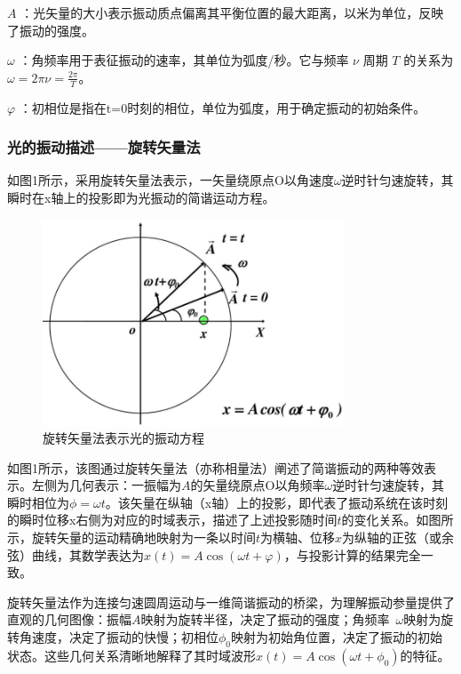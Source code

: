 \documentclass[withoutpreface,bwprint]{cumcmthesis} %
\begin{document}
\(A\) ：光矢量的大小表示振动质点偏离其平衡位置的最大距离，以米为单位，反映了振动的强度。

\(\omega\) ：角频率用于表征振动的速率，其单位为弧度/秒。它与频率 \(\nu\) 周期 \(T\) 的关系为 \(\omega = 2\pi\nu = \frac{2\pi}{T}\)。

\(\varphi\) ：初相位是指在t=0时刻的相位，单位为弧度，用于确定振动的初始条件。

\subsubsection{光的振动描述——旋转矢量法}
如图1所示，采用旋转矢量法表示，一矢量绕原点O以角速度$\omega$逆时针匀速旋转，其瞬时在x轴上的投影即为光振动的简谐运动方程。

\begin{figure}[!h]
    \centering
    \includegraphics[width=0.8\textwidth]{figures/figure1.png} %

    \caption{旋转矢量法表示光的振动方程}
    \label{fig:1}
\end{figure}

如图1所示，该图通过旋转矢量法（亦称相量法）阐述了简谐振动的两种等效表示。左侧为几何表示：一振幅为$A$的矢量绕原点O以角频率$\omega$逆时针匀速旋转，其瞬时相位为$\phi=\omega t$。该矢量在纵轴（x轴）上的投影，即代表了振动系统在该时刻的瞬时位移x右侧为对应的时域表示，描述了上述投影随时间$t$的变化关系。如图所示，旋转矢量的运动精确地映射为一条以时间$t$为横轴、位移$x$为纵轴的正弦（或余弦）曲线，其数学表达为$x(t)=A\cos(\omega t+\varphi)$，与投影计算的结果完全一致。

旋转矢量法作为连接匀速圆周运动与一维简谐振动的桥梁，为理解振动参量提供了直观的几何图像：振幅$A$映射为旋转半径，决定了振动的强度；角频率 $\omega$映射为旋转角速度，决定了振动的快慢；初相位$\phi_0$映射为初始角位置，决定了振动的初始状态。这些几何关系清晰地解释了其时域波形$x(t)=A\cos(\omega t+\phi_0)$的特征。
\end{document}
